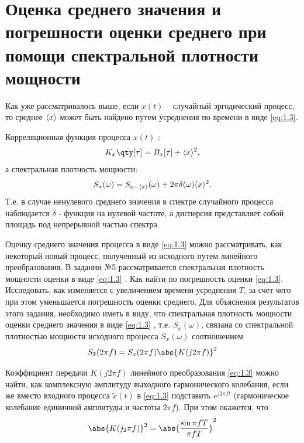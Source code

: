 \section{Оценка среднего значения и погрешности оценки среднего при помощи спектральной 
плотности мощности}%

Как уже рассматривалось выше, если $x(t)$ -- случайный эргодический процесс, то среднее
$\langle x\rangle$ может быть найдено путем усреднения по времени в виде \eqref{eq:1.3}.

Корреляционная функция процесса $x(t)$ :
\begin{equation}
    \label{eq:}
    K_x\qty[\tau] = B_x[\tau] + \mean{x}^2,
\end{equation}
а спектральная плотность мощности:
\begin{equation}
    \label{eq:}
    S_x(\omega) = S_{x-\langle x\rangle}(\omega) + 2 \pi \delta(\omega) \langle x\rangle^2.
\end{equation}
Т.е. в случае ненулевого среднего значения в спектре случайного процесса наблюдается $\delta$ - 
функция на нулевой частоте, а дисперсия представляет собой площадь под непрерывной частью спектра.

Оценку среднего значения процесса в виде \eqref{eq:1.3}  можно рассматривать, как некоторый новый процесс,
полученный из исходного путем линейного преобразования. В задании №5 рассматривается спектральная плотность мощности  оценки  в виде \eqref{eq:1.3} . Как найти по  погрешность оценки \eqref{eq:1.3}. Исследовать, как изменяется  с увеличением времени усреднения $T$, за счет чего при этом уменьшается погрешность оценки среднего.
Для объяснения результатов этого задания, необходимо иметь в виду, что спектральная плотность мощности оценки среднего значения в виде \eqref{eq:1.3} , т.е. $S_{\tilde x}(\omega)$, связана со спектральной плотностью мощности исходного процесса $S_x(\omega)$  соотношением
\begin{equation}
    \label{eq:4.1}
    S_{\tilde x}(2 \pi f) = S_x(2 \pi f) \abs{K(j 2 \pi f)}^2
\end{equation}

Коэффициент передачи  $K(j 2 \pi f)$ линейного преобразования \eqref{eq:1.3}  можно найти, как комплексную амплитуду выходного гармонического колебания, если же вместо входного 
процесса  $\tilde x(t)$ в \eqref{eq:1.3}  подставить $e^{j 2 \pi f t}$ (гармоническое колебание единичной амплитуды и частоты $2 \pi f$). При этом окажется, что 
\begin{equation}
    \label{eq:4.2}
    \abs{K(j_{2} \pi f)}^2 = \abs{\frac{\sin{\pi f T}}{\pi f T}}^2
\end{equation}

